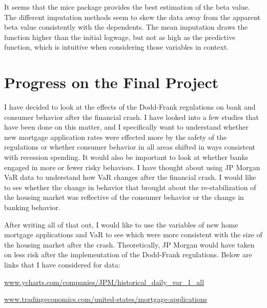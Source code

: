 \documentclass{article}
\begin{document}
It seems that the mice package provides the best estimation of the beta value. The different imputation methods seem to skew the data away from the apparent beta value consistently with the dependents. The mean imputation draws the function higher than the initial logwage, but not as high as the predictive function, which is intuitive when considering those variables in context.

\section{Progress on the Final Project}
I have decided to look at the effects of the Dodd-Frank regulations on bank and consumer behavior after the financial crash. I have looked into a few studies that have been done on this matter, and I specifically want to understand whether new mortgage application rates were effected more by the safety of the regulations or whether consumer behavior in all areas shifted in ways consistent with recession spending. It would also be important to look at whether banks engaged in more or fewer risky behaviors. I have thought about using JP Morgan VaR data to understand how VaR changes after the financial crash. I would like to see whether the change in behavior that brought about the re-stabilization of the housing market was reflective of the consumer behavior or the change in banking behavior.

After writing all of that out, I would like to use the variables of new home mortgage applications and VaR to see which were more consistent with the size of the housing market after the crash. Theoretically, JP Morgan would have taken on less risk after the implementation of the Dodd-Frank regulations. Below are links that I have considered for data:

\url{www.ycharts.com/companies/JPM/historical_daily_var_1_all}

\url{www.tradingeconomics.com/united-states/mortgage-applications}
\end{document}
